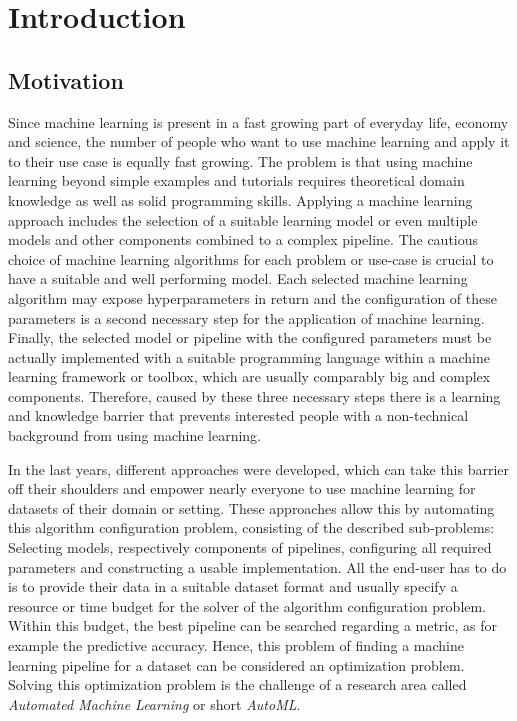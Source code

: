 %
\chapter{Introduction}
\label{sec:intro}

\section{Motivation}
\label{sec:intro:motivation}

Since machine learning is present in a fast growing part of everyday life, economy and science, the number of people who want to use machine learning and apply it to their use case is equally fast growing.
The problem is that using machine learning beyond simple examples and tutorials requires theoretical domain knowledge as well as solid programming skills.\newline
Applying a machine learning approach includes the selection of a suitable learning model or even multiple models and other components combined to a complex pipeline.
The cautious choice of machine learning algorithms for each problem or use-case is crucial to have a suitable and well performing model.
Each selected machine learning algorithm may expose hyperparameters in return and the configuration of these parameters is a second necessary step for the application of machine learning.
Finally, the selected model or pipeline with the configured parameters must be actually implemented with a suitable programming language within a machine learning framework or toolbox, which are usually comparably big and complex components.
Therefore, caused by these three necessary steps there is a learning and knowledge barrier that prevents interested people with a non-technical background from using machine learning.

In the last years, different approaches were developed, which can take this barrier off their shoulders and empower nearly everyone to use machine learning for datasets of their domain or setting.
These approaches allow this by automating this algorithm configuration problem, consisting of the described sub-problems: Selecting models, respectively components of pipelines, configuring all required parameters and constructing a usable implementation.
All the end-user has to do is to provide their data in a suitable dataset format and usually specify a resource or time budget for the solver of the algorithm configuration problem.\newline
Within this budget, the best pipeline can be searched regarding a metric, as for example the predictive accuracy.
Hence, this problem of finding a machine learning pipeline for a dataset can be considered an optimization problem.
Solving this optimization problem is the challenge of a research area called \textit{Automated Machine Learning} or short \textit{AutoML}.

